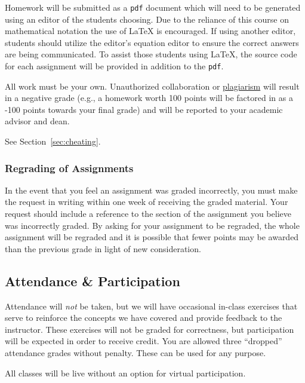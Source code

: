 \documentclass[12pt]{scrartcl}
\begin{document}
Homework will be submitted as a \texttt{pdf} document which will need to be generated using an editor of the students choosing. 
Due to the reliance of this course on mathematical notation the use of \LaTeX{} is encouraged. 
If using another editor, students should utilize the editor's equation editor to ensure the correct answers are being communicated. 
To assist those students using \LaTeX, the source code for each assignment will be provided in addition to the \texttt{pdf}.

\begin{tcolorbox}[colback=red!5,colframe=red!75!black,title=Cheating policy]
All work must be your own. Unauthorized collaboration or \href{https://www.cmu.edu/student-affairs/ocsi/}{plagiarism} will result in a negative grade (e.g., a homework worth 100 points will be factored in as a -100 points towards your final grade) and will be reported to your academic advisor and dean.

\vspace{1em}
See Section~\ref{sec:cheating}.
\end{tcolorbox}

\subsubsection{Regrading of Assignments}
In the event that you feel an assignment was graded incorrectly, 
you must make the request in writing within one week of receiving the graded material.  
Your request should include a reference to the section of the assignment you believe was incorrectly graded.   
By asking for your assignment to be regraded, 
the whole assignment will be regraded and it is possible that fewer points 
may be awarded than the previous grade in light of new consideration.

\subsection{Attendance \& Participation}
Attendance will \emph{not} be taken, 
but we will have occasional in-class exercises that serve to reinforce the concepts we have covered and provide feedback to the instructor. 
These exercises will not be graded for correctness, but participation will be expected in order to receive credit.
You are allowed three ``dropped'' attendance grades without penalty. 
These can be used for any purpose. 

All classes will be live without an option for virtual participation.
\end{document}

